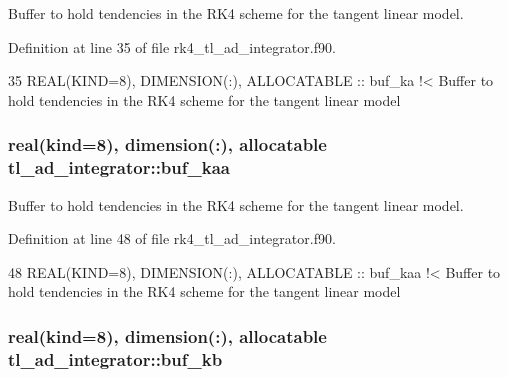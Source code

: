 Buffer to hold tendencies in the R\+K4 scheme for the tangent linear model. 



Definition at line 35 of file rk4\+\_\+tl\+\_\+ad\+\_\+integrator.\+f90.


\begin{DoxyCode}
35   \textcolor{keywordtype}{REAL(KIND=8)}, \textcolor{keywordtype}{DIMENSION(:)}, \textcolor{keywordtype}{ALLOCATABLE} :: buf\_ka\textcolor{comment}{ !< Buffer to hold tendencies in the RK4 scheme for the
       tangent linear model}
\end{DoxyCode}
\subsubsection[{\texorpdfstring{buf\+\_\+kaa}{buf_kaa}}]{\setlength{\rightskip}{0pt plus 5cm}real(kind=8), dimension(\+:), allocatable tl\+\_\+ad\+\_\+integrator\+::buf\+\_\+kaa\hspace{0.3cm}{\ttfamily [private]}}\hypertarget{namespacetl__ad__integrator_a24b147c589eb6bdb6175c56657aff5ae}{}\label{namespacetl__ad__integrator_a24b147c589eb6bdb6175c56657aff5ae}


Buffer to hold tendencies in the R\+K4 scheme for the tangent linear model. 



Definition at line 48 of file rk4\+\_\+tl\+\_\+ad\+\_\+integrator.\+f90.


\begin{DoxyCode}
48   \textcolor{keywordtype}{REAL(KIND=8)}, \textcolor{keywordtype}{DIMENSION(:)}, \textcolor{keywordtype}{ALLOCATABLE} :: buf\_kaa\textcolor{comment}{ !< Buffer to hold tendencies in the RK4 scheme for the
       tangent linear model}
\end{DoxyCode}
\subsubsection[{\texorpdfstring{buf\+\_\+kb}{buf_kb}}]{\setlength{\rightskip}{0pt plus 5cm}real(kind=8), dimension(\+:), allocatable tl\+\_\+ad\+\_\+integrator\+::buf\+\_\+kb\hspace{0.3cm}{\ttfamily [private]}}\hypertarget{namespacetl__ad__integrator_abd6a1c209bc0120ea4e1e473e067a902}{}\label{namespacetl__ad__integrator_abd6a1c209bc0120ea4e1e473e067a902}


